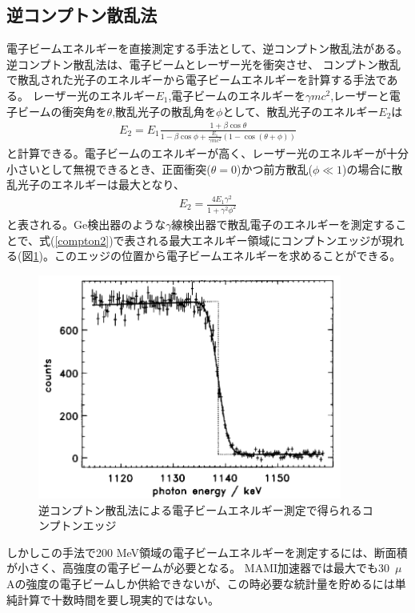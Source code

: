 \documentclass[a4paper,11pt,uplatex]{jsbook}
\begin{document}
\subsection{逆コンプトン散乱法}
電子ビームエネルギーを直接測定する手法として、逆コンプトン散乱法がある。逆コンプトン散乱法は、電子ビームとレーザー光を衝突させ、
コンプトン散乱で散乱された光子のエネルギーから電子ビームエネルギーを計算する手法である。
レーザー光のエネルギー$E_1$,電子ビームのエネルギーを$\gamma mc^2$,レーザーと電子ビームの衝突角を$\theta$,散乱光子の散乱角を$\phi$として、散乱光子のエネルギー$E_2$は
\begin{eqnarray}
  E_2 = E_1\frac{1+\beta\cos{\theta}}{1-\beta\cos{\phi} + \frac{E_1}{\gamma mc^2} (1-\cos{(\theta +\phi)})} \label{compton}
\end{eqnarray}
と計算できる。電子ビームのエネルギーが高く、レーザー光のエネルギーが十分小さいとして無視できるとき、正面衝突($\theta = 0$)かつ前方散乱($\phi \ll 1$)の場合に散乱光子のエネルギーは最大となり、
\begin{eqnarray}
  E_2 = \frac{4E_1\gamma^2}{1 + \gamma^2\phi^2} \label{compton2}
\end{eqnarray}
と表される。Ge検出器のような$\gamma$線検出器で散乱電子のエネルギーを測定することで、式(\ref{compton2})で表される最大エネルギー領域にコンプトンエッジが現れる(図\ref{fig:comp})。このエッジの位置から電子ビームエネルギーを求めることができる。
\begin{figure}[H]
  \centering
  \includegraphics[width=10cm]{image/1-CBS.png}
  \caption[逆コンプトン散乱法]{逆コンプトン散乱法による電子ビームエネルギー測定で得られるコンプトンエッジ\cite{klein1997}}\label{fig:comp}
\end{figure}

しかしこの手法で200 MeV領域の電子ビームエネルギーを測定するには、断面積が小さく、高強度の電子ビームが必要となる。%
MAMI加速器では最大でも30~$\mu$Aの強度の電子ビームしか供給できないが、この時必要な統計量を貯めるには単純計算で十数時間を要し現実的ではない。
\end{document}
